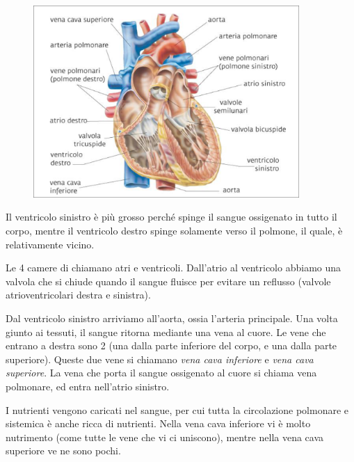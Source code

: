 \documentclass[a4paper]{article}
\begin{document}
\begin{center}
\begin{figure}[th]
    \centering
    \includegraphics[width=0.9\textwidth]{./heart.png}
\end{figure}
\end{center}

Il ventricolo sinistro è più grosso perché spinge il sangue ossigenato in tutto il corpo,
mentre il ventricolo destro spinge solamente verso il polmone, il quale, è relativamente vicino.

Le 4 camere di chiamano atri e ventricoli.
Dall'atrio al ventricolo abbiamo una valvola che si chiude quando il sangue fluisce
per evitare un reflusso (valvole atrioventricolari destra e sinistra).

Dal ventricolo sinistro arriviamo all'aorta, ossia l'arteria principale.
Una volta giunto ai tessuti, il sangue ritorna mediante una vena al cuore.
Le vene che entrano a destra sono 2 (una dalla parte inferiore del corpo, e una dalla parte superiore).
Queste due vene si chiamano \textit{vena cava inferiore} e \textit{vena cava superiore}.
La vena che porta il sangue ossigenato al cuore si chiama vena polmonare, ed entra nell'atrio sinistro.


I nutrienti vengono caricati nel sangue, per cui tutta la circolazione polmonare e sistemica
è anche ricca di nutrienti. Nella vena cava inferiore vi è molto nutrimento
(come tutte le vene che vi ci uniscono), mentre nella vena cava superiore ve ne sono pochi.

\end{document}
